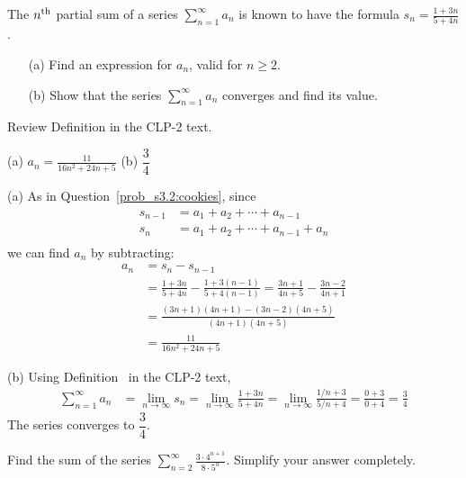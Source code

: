 \begin{question}[2016Q5]
The $n^{\rm th}$ partial sum of a series  $\displaystyle \sum_{n=1}^{\infty}a_n $ is known to
have the formula $\displaystyle s_n = \frac{1+3n}{5+4n}$.
\begin{enumerate}[(a)]
  \item[(a)] Find an expression for $a_n$, valid for $n\ge2$.
  \item[(b)] Show that the series $\displaystyle \sum_{n=1}^{\infty}a_n $ converges
         and find its value.
\end{enumerate}
\end{question}

\begin{hint}
Review Definition   in the CLP-2 text.
\end{hint}

\begin{answer}
(a) $\displaystyle a_n= \frac{11}{16n^2 + 24n +5}$
\qquad (b) $ \dfrac{3}{4}$

\end{answer}

\begin{solution} (a)
As in Question~\ref{prob_s3.2:cookies}, since
\begin{align*}
s_{n-1}& = a_1+a_2+ \cdots + a_{n-1} \\
s_{n}& = a_1+a_2+ \cdots + a_{n-1} +a_n\\
\end{align*}
we can find $a_n$ by subtracting:
\begin{align*}
a_n &= s_n - s_{n-1} \\
&=\frac{1 + 3n}{5+4n} - \frac{1 + 3(n-1)}{5+4(n-1)}
= \frac{3n+1}{4n+5} - \frac{3n - 2}{4n+1}\\
&=  \frac{(3n+1)(4n+1) - (3n - 2) (4n+5)}{(4n+1)(4n+5)} \\
&= \frac{11}{16n^2 + 24n +5}
\end{align*}

\noindent (b)
Using Definition~ in the CLP-2 text,
\begin{align*}
\sum_{n=1}^\infty a_n&= \lim_{n \to \infty}  s_n
  = \lim_{n \to \infty} \frac{1 + 3n}{5+4n}
  = \lim_{n \to \infty} \frac{1/n + 3}{5/n+4}
  = \frac{0+3}{0+4}
  = \frac{3}{4}
\end{align*}
The series converges to $\dfrac{3}{4}$.
\end{solution}


\begin{Mquestion}[2013A]
Find the sum of the series
$ \displaystyle\sum\limits_{n=2}^\infty \frac{3\cdot 4^{n+1}}{8\cdot 5^n}$.
Simplify your answer completely.
\end{Mquestion}

